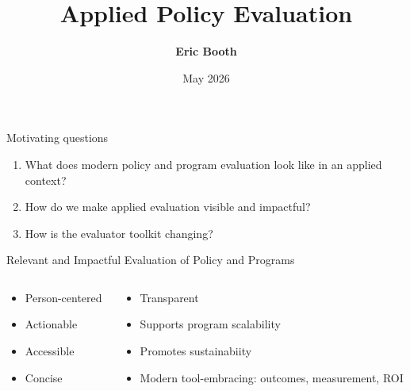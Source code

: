 \documentclass[aspectratio=169, 10pt]{beamer}
\title{Applied Policy Evaluation}
\subtitle{{\color{TXOrange}{Implementation Science, AI, and Modern Causal Inference}}}
\author{\textbf{Eric Booth}}
\institute{
    {Senior Researcher, Texas 2036} \\[.25em] \href{https://www.Texas2036.org}{\texttt{www.Texas2036.org}} \\[0.5em]
	\url{www.github.com/ericabooth}  (slides and materials)
}
\date{May 2026}
\begin{document}
\begin{frame}[plain] %
    \begin{center}
        \footnotesize
    \end{center}
    
    \vspace{-1em} %
    
    \titlepage
\end{frame}

\begin{frame}{Motivating questions}
    \textbf{\Large{}}
    \vfill
\begin{enumerate}
\item What does modern policy and program evaluation look like in an applied context?
\item How do we make applied evaluation visible and impactful?
\item How is the evaluator toolkit changing?
\end{enumerate}
\end{frame}

\begin{frame}{Relevant and Impactful Evaluation of Policy and Programs}

 \begin{columns}[t]
\begin{column}{0.48\linewidth}
        \begin{itemize}
            \item<1-> Person-centered
            \item<1-> Actionable
            \item<1-> Accessible
            \item<1-> Concise
        \end{itemize}
    \end{column}
    \begin{column}{0.48\linewidth}
        \begin{itemize}
            \item<2-> Transparent
            \item<2-> Supports program scalability
            \item<2-> Promotes sustainabiity
            \item<2-> Modern tool-embracing: outcomes, measurement, ROI
        \end{itemize}
\end{column}
    \end{columns}    
    \end{frame}
    
\end{document}
